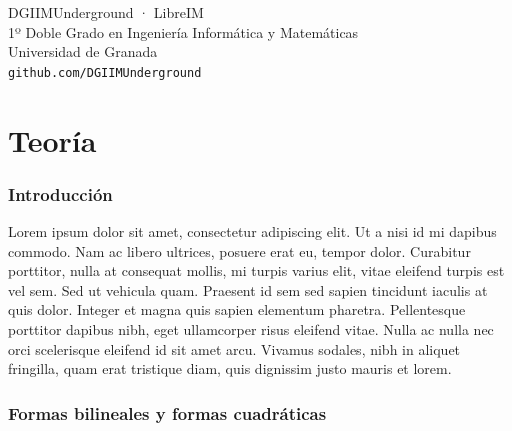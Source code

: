 \documentclass[10pt, a4paper]{article}
\theoremstyle{theorem-style}
\theoremstyle{definition-style}
\theoremstyle{remark-style}
\theoremstyle{example-style}
\theoremstyle{definition-style}
\theoremstyle{remark-style}
\newcommand{\asignatura}{
  Geometría II
}
\newcommand{\autor}{DGIIMUnderground · LibreIM}
\newcommand{\grado}{1º Doble Grado en Ingeniería Informática y Matemáticas}
\newcommand{\universidad}{Universidad de Granada}
\newcommand{\enlaceweb}{github.com/DGIIMUnderground}
\begin{document}
\begin{titlepage}

	\parbox[t]{\textwidth}{
			\raggedright %
			\fontsize{50pt}{50pt}\selectfont\sffamily\color{500}{
			  \textbf{\asignatura}
      }
	}

	\vfill

	\parbox[t]{\textwidth}{
		\raggedright %
		\sffamily\large
		{\Large \autor}\\[4pt]
		\grado\\
		\universidad\\[4pt]
		\texttt{\enlaceweb}
	}

\end{titlepage}


\thispagestyle{empty}
\tableofcontents
\newpage


\part{Teoría}

\section*{Introducción}

Lorem ipsum dolor sit amet, consectetur adipiscing elit. Ut a nisi id mi dapibus commodo. Nam ac libero ultrices, posuere erat eu, tempor dolor. Curabitur porttitor, nulla at consequat mollis, mi turpis varius elit, vitae eleifend turpis est vel sem. Sed ut vehicula quam. Praesent id sem sed sapien tincidunt iaculis at quis dolor. Integer et magna quis sapien elementum pharetra. Pellentesque porttitor dapibus nibh, eget ullamcorper risus eleifend vitae. Nulla ac nulla nec orci scelerisque eleifend id sit amet arcu. Vivamus sodales, nibh in aliquet fringilla, quam erat tristique diam, quis dignissim justo mauris et lorem.

\pagebreak

\section{Formas bilineales y formas cuadráticas}
\end{document}
